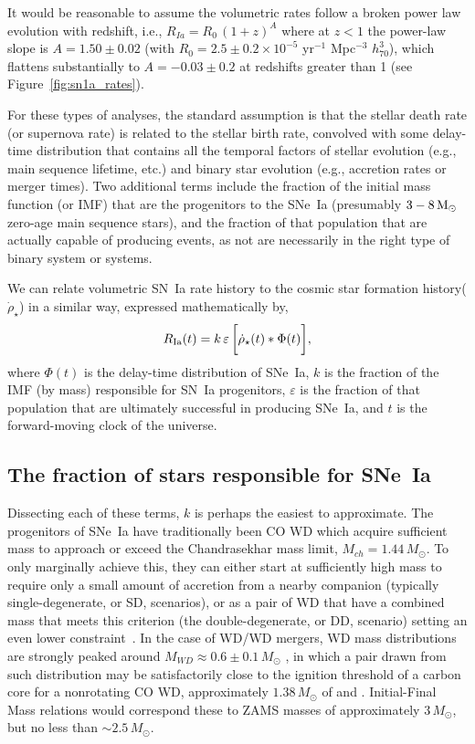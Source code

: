 \documentclass[apj]{aastex}
\begin{document}
It would be reasonable to assume the volumetric rates follow a broken power law evolution with redshift, i.e., $R_{Ia}=R_0\,(1+z)^A$ where at $z<1$ the power-law slope is $A=1.50\pm0.02$ (with $R_0 = 2.5\pm0.2\times10^{-5}$ yr$^{-1}$ Mpc$^{-3}$ $h_{70}^3$), which flattens substantially to $A=-0.03\pm0.2$ at redshifts greater than 1 (see Figure~\ref{fig:sn1a_rates}). 

For these types of analyses, the standard assumption is that the stellar death rate (or supernova rate) is related to the stellar birth rate, convolved with some delay-time distribution that contains all the temporal factors of stellar evolution (e.g., main sequence lifetime, etc.) and binary star evolution (e.g., accretion rates or merger times). Two additional terms include the fraction of the initial mass function (or IMF) that are the progenitors to the SNe~Ia (presumably $3 - 8\, \rm{M}_{\odot}$ zero-age main sequence stars), and the fraction of that population that are actually capable of producing events, as not are necessarily in the right type of binary system or systems.

We can relate volumetric SN~Ia rate history to the cosmic star formation history($\dot{\rho}_{\star}$) in a similar way, expressed mathematically by, 
\begin{equation}
R_{\rm Ia}(t) = k\,\varepsilon\,\biggl[\dot{\rho}_{\star}(t) \ast \Phi(t)\biggr],
\label{eqn:std}
\end{equation}
\noindent where $\Phi(t)$ is the delay-time distribution of SNe~Ia, $k$ is the fraction of the IMF (by mass) responsible for SN~Ia progenitors, $\varepsilon$ is the fraction of that population that are ultimately successful in producing SNe~Ia, and $t$ is the forward-moving clock of the universe. 

\subsection{The fraction of stars responsible for SNe~Ia}
Dissecting each of these terms, $k$ is perhaps the easiest to approximate. The progenitors of SNe~Ia have traditionally been CO WD which acquire sufficient mass to approach or exceed the Chandrasekhar mass limit, $M_{ch}=1.44\,M_{\odot}$. To only marginally achieve this, they can either start at sufficiently high mass to require only a small amount of accretion from a nearby companion (typically single-degenerate, or SD, scenarios), or as a pair of WD that have a combined mass that meets this criterion (the double-degenerate, or DD, scenario) setting an even lower constraint~\cite[see][for a review]{Maoz:2013}. In the case of WD/WD mergers, WD mass distributions are strongly peaked around $M_{WD}\approx0.6\pm0.1\,M_{\odot}$ \citep{Catalan:2008il}, in which a pair drawn from such distribution may be satisfactorily close to the ignition threshold of a carbon core for a nonrotating CO WD, approximately $1.38\, M_{\odot}$ of \cite{Arnett:1969dw} and \cite{Nomoto:1982vh}. Initial-Final Mass relations \cite[e.g.,][]{Catalan:2008il,Cummings:2018oe} would correspond these to ZAMS masses of approximately $3\, M_{\odot}$, but no less than $\sim2.5\, M_{\odot}$. 
\end{document}
